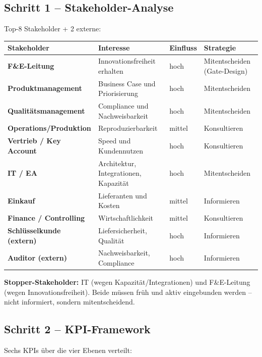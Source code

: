 \documentclass[11pt,a4paper,oneside]{article}
\begin{document}
\subsection{Schritt 1 -- Stakeholder-Analyse}

Top-8 Stakeholder + 2 externe:

\begin{tabularx}{\linewidth}{@{}>{\bfseries}lXll@{}}
\toprule
Stakeholder & Interesse & Einfluss & Strategie \\
\midrule
F\&E-Leitung           & Innovationsfreiheit erhalten            & hoch   & Mitentscheiden (Gate-Design) \\
Produktmanagement      & Business Case und Priorisierung         & hoch   & Mitentscheiden \\
Qualitätsmanagement    & Compliance und Nachweisbarkeit          & hoch   & Mitentscheiden \\
Operations/Produktion  & Reproduzierbarkeit                       & mittel & Konsultieren \\
Vertrieb / Key Account & Speed und Kundennutzen                  & hoch   & Konsultieren \\
IT / EA                & Architektur, Integrationen, Kapazität   & hoch   & Mitentscheiden \\
Einkauf                & Lieferanten und Kosten                  & mittel & Informieren \\
Finance / Controlling  & Wirtschaftlichkeit                      & mittel & Konsultieren \\
\midrule
Schlüsselkunde (extern) & Liefersicherheit, Qualität              & hoch   & Informieren \\
Auditor (extern)       & Nachweisbarkeit, Compliance              & hoch   & Informieren \\
\bottomrule
\end{tabularx}

\medskip

\noindent \textbf{Stopper-Stakeholder:} IT (wegen Kapazität/Integrationen) und F\&E-Leitung (wegen Innovationsfreiheit). Beide müssen früh und aktiv eingebunden werden -- nicht informiert, sondern mitentscheidend.

\subsection{Schritt 2 -- KPI-Framework}

Sechs KPIs über die vier Ebenen verteilt:
\end{document}
